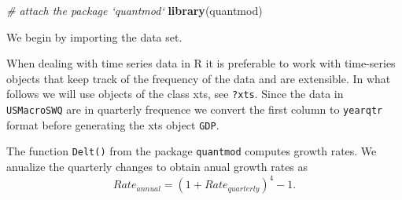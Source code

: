 \documentclass[]{book}
\newenvironment{Shaded}{\begin{snugshade}}{\end{snugshade}}
\newcommand{\KeywordTok}[1]{\textcolor[rgb]{0.13,0.29,0.53}{\textbf{#1}}}
\newcommand{\DataTypeTok}[1]{\textcolor[rgb]{0.13,0.29,0.53}{#1}}
\newcommand{\DecValTok}[1]{\textcolor[rgb]{0.00,0.00,0.81}{#1}}
\newcommand{\StringTok}[1]{\textcolor[rgb]{0.31,0.60,0.02}{#1}}
\newcommand{\CommentTok}[1]{\textcolor[rgb]{0.56,0.35,0.01}{\textit{#1}}}
\newcommand{\OperatorTok}[1]{\textcolor[rgb]{0.81,0.36,0.00}{\textbf{#1}}}
\newcommand{\NormalTok}[1]{#1}
\theoremstyle{definition}
\theoremstyle{definition}
\theoremstyle{definition}
\theoremstyle{remark}
\begin{document}
\begin{Shaded}
\begin{Highlighting}[]
\CommentTok{# attach the package `quantmod`}
\KeywordTok{library}\NormalTok{(quantmod)}
\end{Highlighting}
\end{Shaded}

We begin by importing the data set.

\begin{Shaded}
\end{Shaded}

When dealing with time series data in R it is preferable to work with
time-series objects that keep track of the frequency of the data and are
extensible. In what follows we will use objects of the class xts, see
\texttt{?xts}. Since the data in \texttt{USMacroSWQ} are in quarterly
frequence we convert the first column to \texttt{yearqtr} format before
generating the xts object \texttt{GDP}.

The function \texttt{Delt()} from the package \texttt{quantmod} computes
growth rates. We anualize the quarterly changes to obtain anual growth
rates as \[Rate_{annual} = (1+Rate_{quarterly})^4-1.\]
\end{document}

